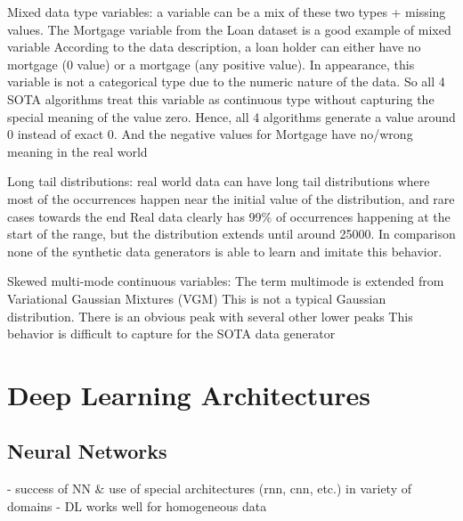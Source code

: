 Mixed data type variables:\cite{zhao2022CTABGANEnhancingTabular}
    a variable can be a mix of these two types + missing values. The Mortgage variable from the Loan dataset is a good example of mixed variable
    According to the data description, a loan holder can either have no mortgage (0 value) or a mortgage (any positive value). 
    In appearance, this variable is not a categorical type due to the numeric nature of the data. 
    So all 4 SOTA algorithms treat this variable as continuous type without capturing the special meaning of the value zero. 
    Hence, all 4 algorithms generate a value around 0 instead of exact 0. And the negative values for Mortgage have no/wrong meaning in the real world

Long tail distributions:\cite{zhao2022CTABGANEnhancingTabular}
    real world data can have long tail distributions where most of the occurrences happen near the initial value of the distribution, and rare cases towards the end
    Real data clearly has 99\% of occurrences happening at the start of the range, 
    but the distribution extends until around 25000. 
    In comparison none of the synthetic data generators is able to learn and imitate this behavior.

Skewed multi-mode continuous variables:\cite{zhao2022CTABGANEnhancingTabular}
    The term multimode is extended from Variational Gaussian Mixtures (VGM)
    This is not a typical Gaussian distribution. There is an obvious peak
    with several other lower peaks
    This behavior is difficult to capture for the SOTA data generator


\section{Deep Learning Architectures}
\label{ch:preliminaries-deepLearningArchitectures}

\subsection{Neural Networks}
\label{ch:preliminaries-deepLearningArchitectures-neuralNetworks}

- success of NN \& use of special architectures (rnn, cnn, etc.) in variety of domains \cite{borisov2022DeepNeuralNetworks}
- DL works well for homogeneous data \cite{borisov2022DeepNeuralNetworks}

